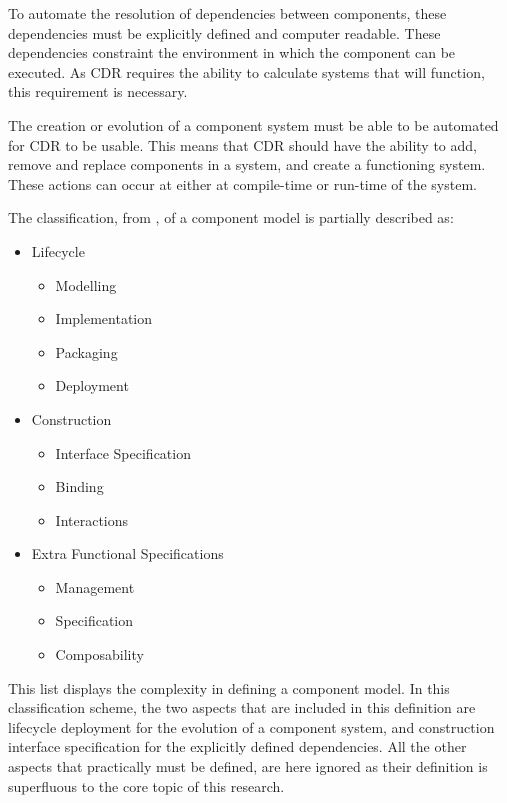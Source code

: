 To automate the resolution of dependencies between components, these dependencies must be explicitly defined and computer readable.
These dependencies constraint the environment in which the component can be executed.
As CDR requires the ability to calculate systems that will function, this requirement is necessary.

The creation or evolution of a component system must be able to be automated for CDR to be usable.
This means that CDR should have the ability to add, remove and replace components in a system, and create a functioning system.
These actions can occur at either at compile-time or run-time of the system.

The classification, from \cite{Crnkovic2011}, of a component model is partially described as:
\begin{itemize}
  \item Lifecycle 
  		\begin{itemize}
	  		\item Modelling
	  		\item Implementation
	  		\item Packaging
	  		\item Deployment
		\end{itemize}
	\item Construction
		\begin{itemize}
	  		\item Interface Specification
	  		\item Binding
	  		\item Interactions 
		\end{itemize}
	\item Extra Functional Specifications
		\begin{itemize}
	  		\item Management
	  		\item Specification
	  		\item Composability
		\end{itemize}	
\end{itemize}  
This list displays the complexity in defining a component model.
In this classification scheme, the two aspects that are included in this definition are lifecycle deployment for the evolution of a component system, 
and construction interface specification for the explicitly defined dependencies.
All the other aspects that practically must be defined, are here ignored as their definition is superfluous to the core topic of this research.

